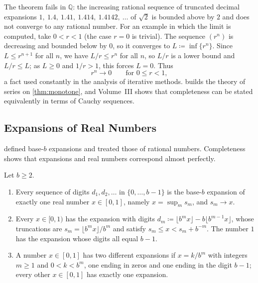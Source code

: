 The theorem fails in $\mathbb Q$: the increasing rational sequence of truncated decimal expansions $1,\ 1.4,\ 1.41,\ 1.414,\ 1.4142,\ \ldots$ of $\sqrt2$ is bounded above by $2$ and does not converge to any rational number. For an example in which the limit is computed, take $0<r<1$ (the case $r=0$ is trivial). The sequence $(r^n)$ is decreasing and bounded below by $0$, so it converges to $L\coloneqq\inf\{r^n\}$. Since $L\le r^{n+1}$ for all $n$, we have $L/r\le r^n$ for all $n$, so $L/r$ is a lower bound and $L/r\le L$; as $L\ge0$ and $1/r>1$, this forces $L=0$. Thus
\begin{equation}
r^n\to0\qquad\text{for }0\le r<1,
\label{eq:rn-zero}
\end{equation}
a fact used constantly in the analysis of iterative methods.  builds the theory of series on \cref{thm:monotone}, and Volume~III shows that completeness can be stated equivalently in terms of Cauchy sequences.

\subsection{Expansions of Real Numbers}

 defined base-$b$ expansions and treated those of rational numbers. Completeness shows that expansions and real numbers correspond almost perfectly.

\begin{theorem}
\label{thm:real-expansion}
Let $b\ge2$.
\begin{enumerate}
\item Every sequence of digits $d_1,d_2,\ldots$ in $\{0,\ldots,b-1\}$ is the base-$b$ expansion of exactly one real number $x\in[0,1]$, namely $x=\sup_ms_m$, and $s_m\to x$.
\item Every $x\in[0,1)$ has the expansion with digits $d_m\coloneqq\lfloor b^mx\rfloor-b\lfloor b^{m-1}x\rfloor$, whose truncations are $s_m=\lfloor b^mx\rfloor/b^m$ and satisfy $s_m\le x<s_m+b^{-m}$. The number $1$ has the expansion whose digits all equal $b-1$.
\item A number $x\in[0,1]$ has two different expansions if $x=k/b^m$ with integers $m\ge1$ and $0<k<b^m$, one ending in zeros and one ending in the digit $b-1$; every other $x\in[0,1]$ has exactly one expansion.
\end{enumerate}
\end{theorem}

